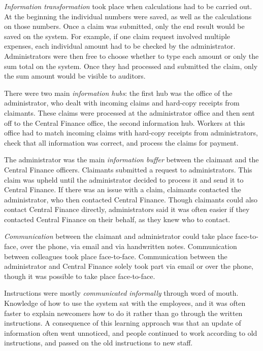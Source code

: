 \textit{Information transformation} took place when calculations had to be carried out. At the beginning the individual numbers were saved, as well as the calculations on those numbers. Once a claim was submitted, only the end result would be saved on the system. For example, if one claim request involved multiple expenses, each individual amount had to be checked by the administrator. Administrators were then free to choose whether to type each amount or only the sum total on the system. Once they had processed and submitted the claim, only the sum amount would be visible to auditors. 

There were two main \textit{information hubs}: the first hub was the office of the administrator, who dealt with incoming claims and hard-copy receipts from claimants. These claims were processed at the administrator office and then sent off to the Central Finance office, the second information hub. Workers at this office had to match incoming claims with hard-copy receipts from administrators, check that all information was correct, and process the claims for payment. 

The administrator was the main\textit{ information buffer }between the claimant and the Central Finance officers. Claimants submitted a request to administrators. This claim was upheld until the administrator decided to process it and send it to Central Finance. If there was an issue with a claim, claimants contacted the administrator, who then contacted Central Finance. Though claimants could also contact Central Finance directly, administrators said it was often easier if they contacted Central Finance on their behalf, as they knew who to contact. 

\textit{Communication} between the claimant and administrator could take place face-to-face, over the phone, via email and via handwritten notes. Communication between colleagues took place face-to-face. Communication between the administrator and Central Finance solely took part via email or over the phone, though it was possible to take place face-to-face.

Instructions were mostly \textit{communicated informally} through word of mouth. Knowledge of how to use the system sat with the employees, and it was often faster to explain newcomers how to do it rather than go through the written instructions. A consequence of this learning approach was that an update of information often went unnoticed, and people continued to work according to old instructions, and passed on the old instructions to new staff. 

